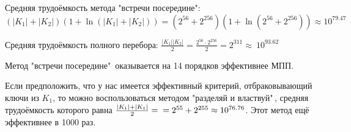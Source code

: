 \documentclass[letterpaper,11pt,openany]{book}
\begin{document}

Средняя трудоёмкость метода "встречи посередине":
$$(|K_1| + |K_2|)(1 + \ln(|K_1| + |K_2|)) = (2^{56} + 2^{256})(1 + \ln(2^{56} + 2^{256})) \approx 10 ^ {79.47}$$

\noindent Средняя трудоёмкость полного перебора: $\frac{|K_1||K_2|}{2} = \frac{2^{56} \cdot 2^{256}}{2} = 2^{311} \approx~10 ^ {93.62}$

Метод "встречи посередине"\ оказывается на 14 порядков эффективнее МПП.

Если предположить, что у нас имеется эффективный критерий, отбраковывающий ключи из $K_1$, то можно воспользоваться методом "разделяй и властвуй"\,, средняя трудоёмкость которого равна $\frac{|K_1| + |K_1|}{2} = \\ = 2^{55} + 2^{255} \approx 10 ^ {76.76}$. Этот метод ещё эффективнее в 1000 раз.
\end{document}
